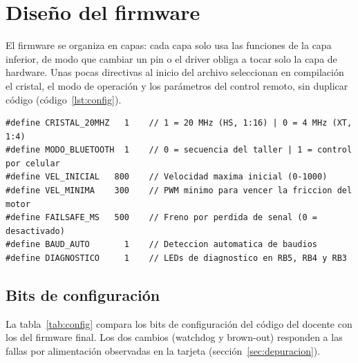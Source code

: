 \section{Diseño del firmware}
\label{sec:firmware}

El firmware se organiza en capas: cada capa solo usa las funciones de la capa
inferior, de modo que cambiar un pin o el driver obliga a tocar solo la capa de
hardware. Unas pocas directivas al inicio del archivo seleccionan en
compilación el cristal, el modo de operación y los parámetros del control
remoto, sin duplicar código (código~\ref{lst:config}).

\begin{lstlisting}[caption={Parámetros de compilación del firmware.}, label={lst:config}, numbers=none]
#define CRISTAL_20MHZ   1    // 1 = 20 MHz (HS, 1:16) | 0 = 4 MHz (XT, 1:4)
#define MODO_BLUETOOTH  1    // 0 = secuencia del taller | 1 = control por celular
#define VEL_INICIAL   800    // Velocidad maxima inicial (0-1000)
#define VEL_MINIMA    300    // PWM minimo para vencer la friccion del motor
#define FAILSAFE_MS   500    // Freno por perdida de senal (0 = desactivado)
#define BAUD_AUTO       1    // Deteccion automatica de baudios
#define DIAGNOSTICO     1    // LEDs de diagnostico en RB5, RB4 y RB3
\end{lstlisting}

\subsection{Bits de configuración}

La tabla~\ref{tab:config} compara los bits de configuración del código del
docente con los del firmware final. Los dos cambios (watchdog y brown-out)
responden a las fallas por alimentación observadas en la tarjeta
(sección~\ref{sec:depuracion}).


